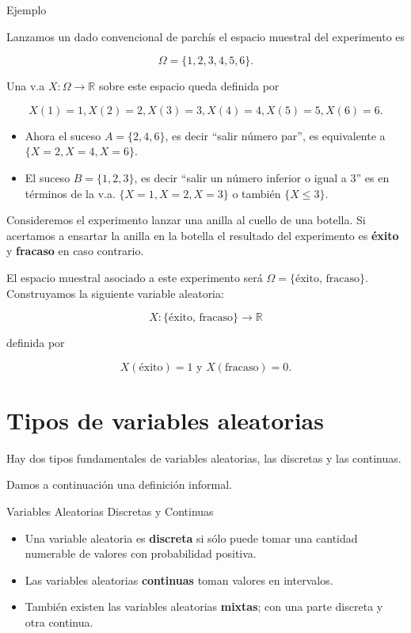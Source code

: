 \documentclass[
  letterpaper,
  DIV=11,
  numbers=noendperiod]{scrreprt}
\providecommand{\tightlist}{%
  \setlength{\itemsep}{0pt}\setlength{\parskip}{0pt}}\usepackage{longtable,booktabs,array}
\begin{document}
\begin{Ejemplo}{Ejemplo}{}

Lanzamos un dado convencional de parchís el espacio muestral del
experimento es

\[\Omega=\{1,2, 3, 4,  5, 6\}.\]

Una v.a \(X:\Omega\to\mathbb{R}\) sobre este espacio queda definida por

\[X(1)=1, X(2)=2, X(3)=3, X(4)=4, X(5)=5, X(6)=6.\]

\begin{itemize}
\tightlist
\item
  Ahora el suceso \(A=\{2, 4, 6\}\), es decir ``salir número par'', es
  equivalente a \(\{X=2,X=4,X=6\}\).
\item
  El suceso \(B=\{1,2,3\}\), es decir ``salir un número inferior o igual
  a \(3\)'' es en términos de la v.a. \(\{X=1,X=2,X=3\}\) o también
  \(\{X\leq
  3\}\).
\end{itemize}

Consideremos el experimento lanzar una anilla al cuello de una botella.
Si acertamos a ensartar la anilla en la botella el resultado del
experimento es \textbf{éxito} y \textbf{fracaso} en caso contrario.

El espacio muestral asociado a este experimento será
\(\Omega=\{\mbox{éxito, fracaso}\}\). Construyamos la siguiente variable
aleatoria:

\[X:\{\mbox{éxito, fracaso}\}\to\mathbb{R}\]

definida por

\[X(\mbox{éxito})=1 \mbox{ y } X(\mbox{fracaso})=0.\]

\end{Ejemplo}

\section{Tipos de variables
aleatorias}\label{tipos-de-variables-aleatorias}

Hay dos tipos fundamentales de variables aleatorias, las discretas y las
continuas.

Damos a continuación una definición informal.

\begin{Definicion}{Variables Aleatorias Discretas y Continuas}{}

\begin{itemize}
\tightlist
\item
  Una variable aleatoria es \textbf{discreta} si sólo puede tomar una
  cantidad numerable de valores con probabilidad positiva.
\item
  Las variables aleatorias \textbf{continuas} toman valores en
  intervalos.
\item
  También existen las variables aleatorias \textbf{mixtas}; con una
  parte discreta y otra continua.
\end{itemize}

\end{Definicion}
\end{document}
